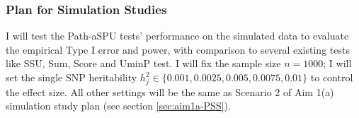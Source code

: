 \documentclass[12pt]{article}
\begin{document}


\subsubsection{Plan for Simulation Studies}\label{sec:aim2-PSS}
I will test the Path-aSPU tests' performance on the simulated data to evaluate the empirical Type I error and power, with comparison to several existing tests like SSU, Sum, Score and UminP test. I will fix the sample size $n =  1000$; I will set the single SNP heritability $h_j^2 \in \{0.001, 0.0025, 0.005, 0.0075, 0.01\}$ to control the effect size. All other settings will be the same as Scenario 2 of Aim 1(a) simulation study plan (see section \ref{sec:aim1a-PSS}). 

\end{document}
